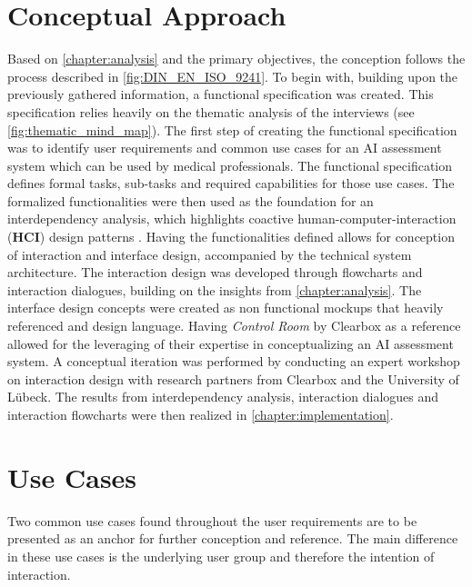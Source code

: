 \documentclass[11pt,a4paper,english]{scrreprt}
\begin{document}
\section{Conceptual Approach}\label{section:conceptual_approach}
Based on \autoref{chapter:analysis} and the primary objectives, the conception follows the process described in \autoref{fig:DIN_EN_ISO_9241}. To begin with, building upon the previously gathered information, a functional specification was created. This specification relies heavily on the thematic analysis of the interviews (see \autoref{fig:thematic_mind_map}). The first step of creating the functional specification was to identify user requirements and common use cases \parencite{kopetz_functional_1976,garrett_ux_2000} for an AI assessment system which can be used by medical professionals. The functional specification defines formal tasks, sub-tasks and required capabilities for those use cases. The formalized functionalities were then used as the foundation for an interdependency analysis, which highlights coactive human-computer-interaction (\textbf{HCI}) design patterns \parencite{johnson_coactive_2014}. Having the functionalities defined allows for conception of interaction and interface design, accompanied by the technical system architecture. The interaction design was developed through flowcharts and interaction dialogues, building on the insights from \autoref{chapter:analysis}. The interface design concepts were created as non functional mockups that heavily referenced \textcite{people_ai_google_website} and \textcite{clearbox_website} design language. Having \textit{Control Room} by Clearbox as a reference allowed for the leveraging of their expertise in conceptualizing an AI assessment system. A conceptual iteration was performed by conducting an expert workshop on interaction design with research partners from Clearbox and the University of Lübeck. The results from interdependency analysis, interaction dialogues and interaction flowcharts were then realized in \autoref{chapter:implementation}.

\section{Use Cases}\label{section:use_cases}
Two common use cases found throughout the user requirements are to be presented as an anchor for further conception and reference. The main difference in these use cases is the underlying user group and therefore the intention of interaction.
\end{document}
